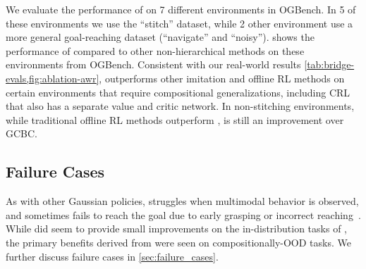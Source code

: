 We evaluate the performance of \Method{} on 7 different environments in OGBench.
In 5 of these environments we use the ``stitch'' dataset, while 2 other environment use a more general goal-reaching dataset (``navigate'' and ``noisy'').
 shows the performance of \Method{} compared to other non-hierarchical methods on these environments from OGBench.
Consistent with our real-world results \cref{tab:bridge-evals,fig:ablation-awr}, \Method{}
outperforms other imitation and offline RL methods on certain environments that require compositional generalizations, including CRL \citep{eysenbach2022contrastive} that also has a separate value and critic network.
In non-stitching environments, while traditional offline RL methods outperform \Method{}, \Method{} is still an improvement over GCBC.

\subsection{Failure Cases}
\label{sec:more_failure_cases}

As with other Gaussian policies, \Method{} struggles when multimodal behavior is observed, and sometimes fails to reach the goal due to early grasping or incorrect reaching~\citep{kumar2023pre}.
While \Method{} did seem to provide small improvements on the in-distribution tasks of , the primary benefits derived from \Method{} were seen on compositionally-OOD tasks.
We further discuss failure cases in \cref{sec:failure_cases}.

